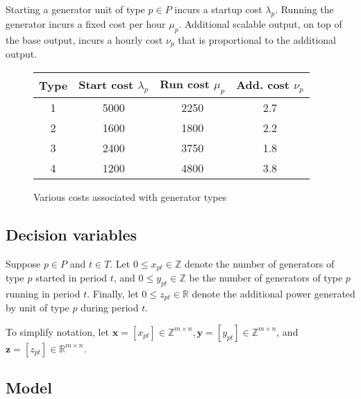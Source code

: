 \documentclass[8pt,oneside]{extarticle}
\newcommand{\Real}{\mathbb{R}}
\newcommand{\Int}{\mathbb{Z}}
\newcommand{\vect}[1]{\boldsymbol{#1}}
\begin{document}
\newpage

Starting a generator unit of type $p\in P$ incurs a startup cost $\lambda_p$. Running the generator
incurs a fixed cost per hour $\mu_p$. Additional scalable output, on top of
the base output, incurs a hourly cost $\nu_p$ that is proportional to the additional output.

\begin{figure}[h]
    \protect\label{fig:a6-costs}
    \center
    \caption{Various costs associated with generator types}
    \begin{tabular}{cccc}
        \hline
        \textbf{Type} & \textbf{Start cost} $\lambda_p$ & \textbf{Run cost} $\mu_p$ & \textbf{Add. cost} $\nu_p$ \\
        \hline
        1 & 5000 & 2250 & 2.7 \\
        2 & 1600 & 1800 & 2.2 \\
        3 & 2400 & 3750 & 1.8 \\
        4 & 1200 & 4800 & 3.8 \\
        \hline
    \end{tabular}
\end{figure}


\subsection{Decision variables}

Suppose $p\in P$ and $t\in T$. Let
$0 \leq x_{pt} \in\Int$ denote the number of generators of type $p$ started in
period $t$, and
$0 \leq y_{pt} \in\Int$ be the number of generators of type $p$ running in
period $t$. Finally, let $0 \leq z_{pt}\in\Real$ denote the additional power generated by unit of type $p$ during
period $t$. 

To simplify notation, let $\vect{x} = \left[x_{pt}\right] \in
\Int^{m\times n}, \vect{y} = \left[y_{pt}\right] \in \Int^{m\times n}$,
and $\vect{z} = \left[z_{pt}\right] \in \Real^{m\times n}$.

\subsection{Model}
\end{document}
